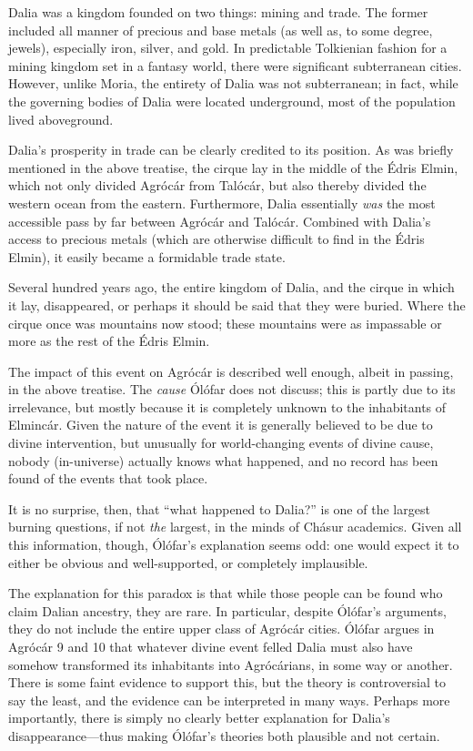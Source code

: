 \documentclass{article}
\begin{document}
Dalia was a kingdom founded on two things: mining and trade. The former included all manner of precious and base metals (as well as, to some degree, jewels), especially iron, silver, and gold. In predictable Tolkienian fashion for a mining kingdom set in a fantasy world, there were significant subterranean cities. However, unlike Moria, the entirety of Dalia was not subterranean; in fact, while the governing bodies of Dalia were located underground, most of the population lived aboveground.

Dalia's prosperity in trade can be clearly credited to its position.  As was briefly mentioned in the above treatise, the cirque lay in the middle of the Édris Elmin, which not only divided Agrócár from Talócár, but also thereby divided the western ocean from the eastern. Furthermore, Dalia essentially \emph{was} the most accessible pass by far between Agrócár and Talócár. Combined with Dalia's access to precious metals (which are otherwise difficult to find in the Édris Elmin), it easily became a formidable trade state.

Several hundred years ago, the entire kingdom of Dalia, and the cirque in which it lay, disappeared, or perhaps it should be said that they were buried. Where the cirque once was mountains now stood; these mountains were as impassable or more as the rest of the Édris Elmin.

The impact of this event on Agrócár is described well enough, albeit in passing, in the above treatise. The \emph{cause} Ólófar does not discuss; this is partly due to its irrelevance, but mostly because it is completely unknown to the inhabitants of Elmincár. Given the nature of the event it is generally believed to be due to divine intervention, but unusually for world-changing events of divine cause, nobody (in-universe) actually knows what happened, and no record has been found of the events that took place.

It is no surprise, then, that ``what happened to Dalia?'' is one of the largest burning questions, if not \emph{the} largest, in the minds of Chásur academics. Given all this information, though, Ólófar's explanation seems odd: one would expect it to either be obvious and well-supported, or completely implausible.

The explanation for this paradox is that while those people can be found who claim Dalian ancestry, they are rare. In particular, despite Ólófar's arguments, they do not include the entire upper class of Agrócár cities. Ólófar argues in Agrócár 9 and 10 that whatever divine event felled Dalia must also have somehow transformed its inhabitants into Agrócárians, in some way or another. There is some faint evidence to support this, but the theory is controversial to say the least, and the evidence can be interpreted in many ways. Perhaps more importantly, there is simply no clearly better explanation for Dalia's disappearance—thus making Ólófar's theories both plausible and not certain.
\end{document}
